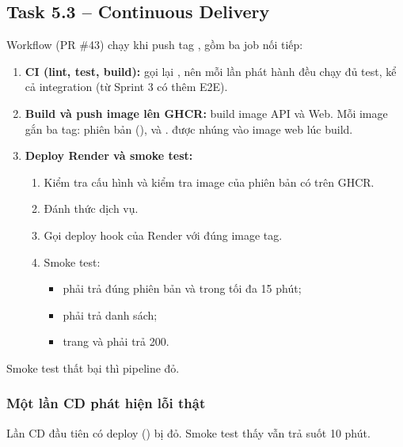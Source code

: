 \subsection{Task 5.3 -- Continuous Delivery}
Workflow  (PR \#43) chạy khi push tag , gồm ba job nối tiếp:

\begin{enumerate}
\item \textbf{CI (lint, test, build):} gọi lại , nên mỗi lần phát hành đều chạy đủ test, kể cả integration (từ Sprint 3 có thêm E2E).
\item \textbf{Build và push image lên GHCR:} build image API và Web. Mỗi image gắn ba tag: phiên bản (),  và .  được nhúng vào image web lúc build.
\item \textbf{Deploy Render và smoke test:}
  \begin{enumerate}
  \item Kiểm tra cấu hình và kiểm tra image của phiên bản có trên GHCR.
  \item Đánh thức dịch vụ.
  \item Gọi deploy hook của Render với đúng image tag.
  \item Smoke test:
    \begin{itemize}
    \item {} phải trả đúng phiên bản và  trong tối đa 15 phút;
    \item {} phải trả danh sách;
    \item trang \code{/} và  phải trả 200.
    \end{itemize}
  \end{enumerate}
\end{enumerate}

Smoke test thất bại thì pipeline đỏ.


\subsubsection{Một lần CD phát hiện lỗi thật}
Lần CD đầu tiên có deploy () bị đỏ. Smoke test thấy  vẫn trả  suốt 10 phút.

